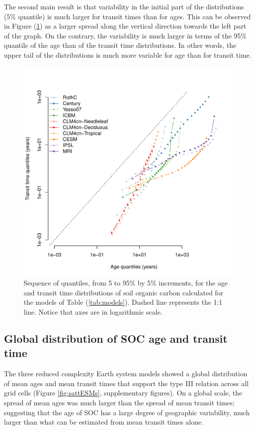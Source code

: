 \documentclass[draft,linenumbers]{agujournal}
\begin{document}
The second main result is that variability in the initial part of the distributions (5\% quantile) is much larger for transit times than for ages. This can be observed in Figure (\ref{fig:quantiles}) as a larger spread along the vertical direction towards the left part of the graph. On the contrary, the variability is much larger in terms of the 95\% quantile of the age than of the transit time distributions. In other words, the upper tail of the distributions is much more variable for age than for transit time. 


\begin{figure}[t]
   \centering
   \includegraphics[scale=0.75]{Figures/modelQ} %
   \caption{Sequence of quantiles, from 5 to 95\% by 5\% increments, for the age and transit time distributions of soil organic carbon calculated for the models of Table (\ref{tab:models}). Dashed line represents the 1:1 line. Notice that axes are in logarithmic scale.}
   \label{fig:quantiles}
\end{figure}

\subsection{Global distribution of SOC age and transit time}
The three reduced complexity Earth system models showed a global distribution of mean ages and mean transit times that support the type III relation across all grid cells (Figure \ref{fig:sattESMs}, supplementary figures). On a global scale, the spread of mean ages was much larger than the spread of mean transit times; suggesting that the age of SOC has a large degree of geographic variability, much larger than what can be estimated from mean transit times alone.
\end{document}
